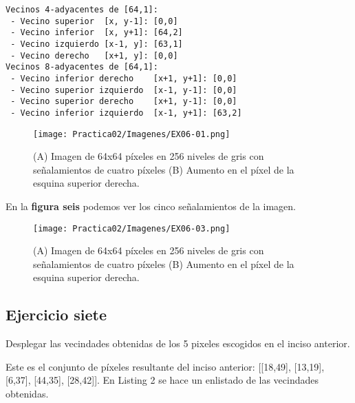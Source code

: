\documentclass[
  journal=largetwo,
  manuscript=Practica-Dos,
  year=2024-1, %
  volume=37,
  spanish, %
]{cup-journal}
\begin{document}
\begin{lstlisting}[style=Matlab-editor, caption=MATLAB Code Example, basicstyle=\fontsize{8}{12}\selectfont]
Vecinos 4-adyacentes de [64,1]:
 - Vecino superior  [x, y-1]: [0,0]
 - Vecino inferior  [x, y+1]: [64,2]
 - Vecino izquierdo [x-1, y]: [63,1]
 - Vecino derecho   [x+1, y]: [0,0]
Vecinos 8-adyacentes de [64,1]:
 - Vecino inferior derecho    [x+1, y+1]: [0,0]
 - Vecino superior izquierdo  [x-1, y-1]: [0,0]
 - Vecino superior derecho    [x+1, y-1]: [0,0]
 - Vecino inferior izquierdo  [x-1, y+1]: [63,2]
\end{lstlisting}

\begin{figure}[hbt!]
\centering
\texttt{[image: Practica02/Imagenes/EX06-01.png]}
\caption{(A) Imagen de 64x64 píxeles en 256 niveles de gris con señalamientos de cuatro píxeles (B) Aumento en el píxel de la esquina superior derecha.}
\label{fig_sim}
\end{figure}

En la \textbf{figura seis} podemos ver los cinco señalamientos de la imagen.

\begin{figure}[hbt!]
\centering
\texttt{[image: Practica02/Imagenes/EX06-03.png]}
\caption{(A) Imagen de 64x64 píxeles en 256 niveles de gris con señalamientos de cuatro píxeles (B) Aumento en el píxel de la esquina superior derecha.}
\label{fig_sim}
\end{figure}



\subsection{Ejercicio siete}

Desplegar las vecindades obtenidas de los 5 pixeles escogidos en el inciso anterior.

Este es el conjunto de píxeles resultante del inciso anterior: [[18,49], [13,19], [6,37], [44,35], [28,42]]. En Listing 2 se hace un enlistado de las vecindades obtenidas.
\end{document}
